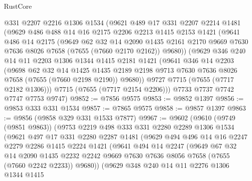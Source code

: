 \begin{lexlean}{RustCore}
\begin{coremodule}
    @331
    @2207
    @2216
    @1306
    @1534
    (@9621
      @489
      @17
      @331
      @2207
      @2214
      @1481
      (@9629
        @486
        @488
        @14
        @16
        @2175
        @2206
        @2213
        @1415
        @2153
        @1421
        (@9641
          @486
          @14
          @2175
          (@9649
            @62
            @32
            @14
            @2090
            @1435
            @2161
            @2170
            @9669
            @7630
            @7636
            @8026
            @7658
            (@7655 (@7660 @2170 @2162))
            @9680))
        (@9629
          @346
          @240
          @14
          @11
          @2203
          @1306
          @1344
          @1415
          @2181
          @1421
          (@9641
            @346
            @14
            @2203
            (@9698
              @62
              @32
              @14
              @1425
              @1435
              @2189
              @2198
              @9713
              @7630
              @7636
              @8026
              @7658
              (@7655 (@7660 @2198 @2190))
              @9680))
          @9727
          @7715
          (@7655 (@7717 @2182 @1306)))
        @7715
        (@7655 (@7717 @2154 @2206)))
      @7733
      @7737
      @7742
      @7747
      @7753
      @9747)
@9852 := @7856 @9575
@9853 := @9852 @1397
@9856 := @9853 @333 @331 @1534
@9857 := @7865 @9575
@9858 := @9857 @1397
@9863 := @9856 (@9858 @329 @331 @1533 @7877)
@9967 := @9602
    (@9610
      (@9749 (@9851 @9863))
      (@9753
        @2219
        @498
        @333
        @331
        @2280
        @2289
        @1306
        @1534
        (@9621
          @497
          @17
          @331
          @2280
          @2287
          @1481
          (@9629
            @494
            @496
            @14
            @16
            @2247
            @2279
            @2286
            @1415
            @2224
            @1421
            (@9641
              @494
              @14
              @2247
              (@9649
                @67
                @32
                @14
                @2090
                @1435
                @2232
                @2242
                @9669
                @7630
                @7636
                @8056
                @7658
                (@7655 (@7660 @2242 @2233))
                @9680))
            (@9629
              @348
              @240
              @14
              @11
              @2276
              @1306
              @1344
              @1415

\end{coremodule}
\end{lexlean}
